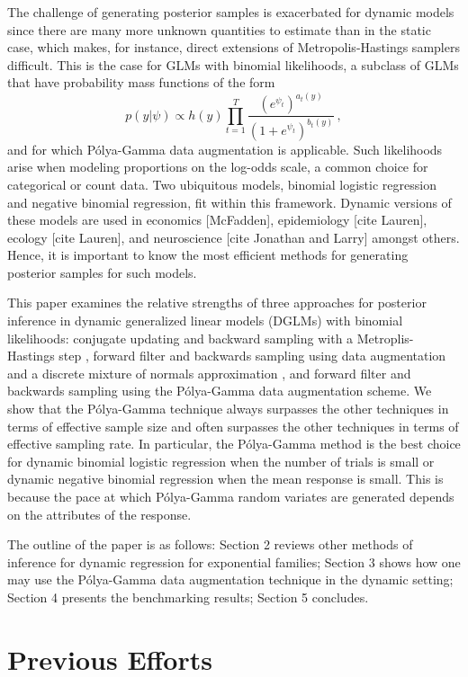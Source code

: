 \documentclass[12pt]{article}
\newcommand{\Polya}{P\'{o}lya}
\begin{document}
The challenge of generating posterior samples is exacerbated for dynamic models
since there are many more unknown quantities to estimate than in the static
case, which makes, for instance, direct extensions of Metropolis-Hastings
samplers difficult.  This is the case for GLMs with binomial likelihoods, a
subclass of GLMs that have probability mass functions of the form
\[
p(y | \psi) \propto h(y) \prod_{t=1}^T
\frac{(e^{\psi_t})^{a_t(y)}}{(1+e^{\psi_t})^{b_t(y)}} \, ,
\]
and for which \Polya-Gamma data augmentation is applicable.  Such likelihoods
arise when modeling proportions on the log-odds scale, a common choice for
categorical or count data.  Two ubiquitous models, binomial logistic regression and
negative binomial regression, fit within this framework.  Dynamic versions of
these models are used in economics [McFadden], epidemiology [cite Lauren],
ecology [cite Lauren], and neuroscience [cite Jonathan and Larry] amongst
others.  Hence, it is important to know the most efficient methods for
generating posterior samples for such models.

This paper examines the relative strengths of three approaches for posterior
inference in dynamic generalized linear models (DGLMs) with binomial
likelihoods: conjugate updating and backward sampling with a Metroplis-Hastings
step \citep{ravines-etal-2006}, forward filter and backwards sampling using data
augmentation and a discrete mixture of normals approximation
\citep{fruhwirth-schnatter-etal-2009, fussl-etal-2013}, and forward filter and
backwards sampling using the \Polya-Gamma data augmentation scheme.  We show
that the \Polya-Gamma technique always surpasses the other techniques in terms of
effective sample size and often surpasses the other techniques in terms of
effective sampling rate.  In particular, the \Polya-Gamma method is the best
choice for dynamic binomial logistic regression when the number of trials is
small or dynamic negative binomial regression when the mean response is small.
This is because the pace at which \Polya-Gamma random variates are generated
depends on the attributes of the response.

The outline of the paper is as follows: Section 2 reviews other methods of
inference for dynamic regression for exponential families; Section 3 shows how
one may use the \Polya-Gamma data augmentation technique in the dynamic setting;
Section 4 presents the benchmarking results; Section 5 concludes.

\section{Previous Efforts}
\end{document}
